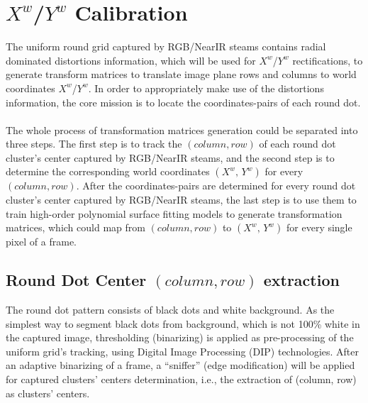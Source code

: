 \section{\(X^{w}\)/\(Y^{w}\) Calibration}
\label{sectionXY_rectification}
The uniform round grid captured by RGB/NearIR steams contains radial dominated distortions information, which will be used for \(X^{w}\)/\(Y^{w}\) rectifications, to generate transform matrices to translate image plane rows and columns to world coordinates \(X^{w}\)/\(Y^{w}\). In order to appropriately make use of the distortions information, the core mission is to locate the coordinates-pairs of each round dot. \\\\
%
The whole process of transformation matrices generation could be separated into three steps. %
The first step is to track the \((column, row)\) of each round dot cluster's center captured by RGB/NearIR steams, and the second step is to determine the corresponding world coordinates \((X^w, \,Y^w)\) for every \((column, row)\). After the coordinates-pairs are determined for every round dot cluster's center captured by RGB/NearIR steams, the last step is to use them to train high-order polynomial surface fitting models to generate transformation matrices, which could map from \((column, row)\) to \((X^w, \,Y^w)\) for every single pixel of a frame.
%
\subsection{Round Dot Center \((column, row)\) extraction}
\label{RowColumnExtraction}
The round dot pattern consists of black dots and white background. As the simplest way to segment black dots from background, which is not 100\% white in the captured image, thresholding (binarizing) is applied as pre-processing of the uniform grid's tracking, using Digital Image Processing (DIP) technologies. After an adaptive binarizing of a frame, a \enquote{sniffer} (edge modification) will be applied for captured clusters' centers determination, i.e., the extraction of (column, row) as clusters' centers.\par
%
